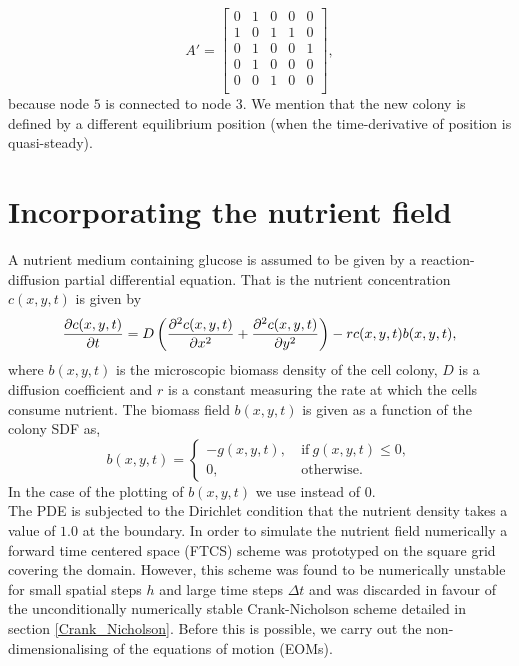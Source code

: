 \begin{equation*}
    A' = 
    \begin{bmatrix}
    0 & 1 & 0 & 0 & 0  \\
    1 & 0 & 1 & 1 & 0  \\
    0 & 1 & 0 & 0 & 1  \\
    0 & 1 & 0 & 0 & 0  \\
    0 & 0 & 1 & 0 & 0  \\ 
    \end{bmatrix},
\end{equation*}
because node $5$ is connected to node $3$. We mention that the new colony 
is defined by a different equilibrium position (when the time-derivative of 
position is quasi-steady).



\section{Incorporating the nutrient field} \label{sec:nutrientField}
A nutrient medium containing glucose is assumed to be given by a reaction-diffusion 
partial differential equation. That is the nutrient concentration $c(x,y,t)$ is given by
\begin{equation*}
    \pdv{c(x,y,t)}{t} = D \left( \frac{\partial^2 c(x,y,t)}{\partial x^2} + 
                          \frac{\partial^2 c(x,y,t)}{\partial y^2} \right) - r c(x,y,t) b(x,y,t),
\end{equation*}
where $b(x,y,t)$ is the microscopic biomass density of the cell colony, $D$ is a diffusion
coefficient and $r$ is a constant measuring the rate at which the cells consume nutrient.
The biomass field $b(x,y,t)$ is given as a function of the colony SDF as,
\begin{equation*}
    b(x,y,t) = \begin{cases}
                -g(x,y,t), & \ \textrm{if} \ g(x,y,t) \leq 0, \\
                0,         & \ \textrm{otherwise}.
               \end{cases}
\end{equation*}
In the case of the plotting of $b(x,y,t)$ we use  instead of $0$. 
\\

The PDE is subjected to the Dirichlet condition
that the nutrient density takes a value of $1.0$ at the boundary. In order to simulate the nutrient field
numerically a forward time centered space (FTCS) scheme was prototyped on the square grid 
covering the domain. However, this scheme was found to be numerically unstable
for small spatial steps $h$ and large time steps $\Delta t$ and was discarded
in favour of the unconditionally numerically stable Crank-Nicholson scheme detailed
in section \ref{Crank_Nicholson}. Before this is possible, 
we carry out the non-dimensionalising of the equations of motion (EOMs).


